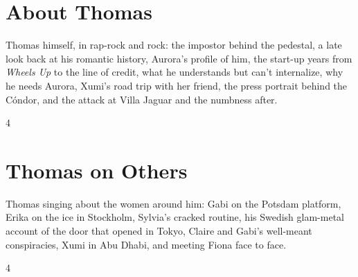 \documentclass[a4paper,landscape]{memoir}
\begin{document}
\chapter{About Thomas}
Thomas himself, in rap-rock and rock: the impostor behind the pedestal, a late look back at his romantic history, Aurora's profile of him, the start-up years from \emph{Wheels Up} to the line of credit, what he understands but can't internalize, why he needs Aurora, Xumi's road trip with her friend, the press portrait behind the Cóndor, and the attack at Villa Jaguar and the numbness after.
\clearpage\begin{multicols*}{4}
\end{multicols*}

\chapter{Thomas on Others}
Thomas singing about the women around him: Gabi on the Potsdam platform, Erika on the ice in Stockholm, Sylvia's cracked routine, his Swedish glam-metal account of the door that opened in Tokyo, Claire and Gabi's well-meant conspiracies, Xumi in Abu Dhabi, and meeting Fiona face to face.
\clearpage\begin{multicols*}{4}
\end{multicols*}
\end{document}

